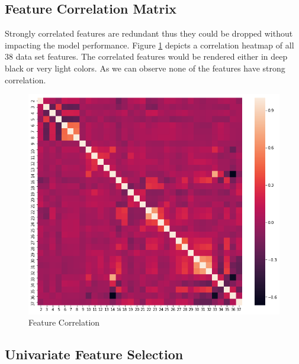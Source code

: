 \hypertarget{feature-correlation-matrix}{%
\subsection{Feature Correlation
Matrix}\label{feature-correlation-matrix}}

Strongly correlated features are redundant thus they could be dropped
without impacting the model performance. Figure \ref{fig:cmatrix}
depicts a correlation heatmap of all 38 data set features. The
correlated features would be rendered either in deep black or very light
colors. As we can observe none of the features have strong correlation.

\begin{Schunk}
\begin{figure}[H]

{\centering \includegraphics[width=1\linewidth]{../../artifacts/cmatrix} 

}

\caption[Feature Correlation]{Feature Correlation}\label{fig:cmatrix}
\end{figure}
\end{Schunk}

\hypertarget{univariate-feature-selection}{%
\subsection{Univariate Feature
Selection}\label{univariate-feature-selection}}

